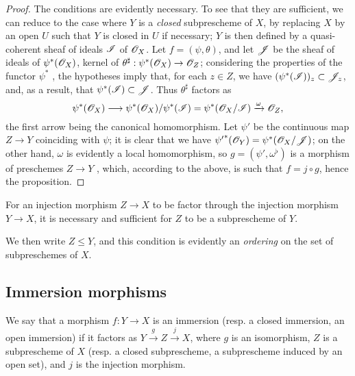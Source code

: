\begin{proof}
The conditions are evidently necessary.
To see that they are sufficient, we can reduce to the case where $Y$ is a \emph{closed} subprescheme of $X$, by replacing $X$ by an open $U$ such that $Y$ is closed in $U$  if necessary;
$Y$ is then defined by a quasi-coherent sheaf of ideals $\mathscr{I}$ of $\mathscr{O}_X$.
Let $f=(\psi,\theta)$, and let $\mathscr{J}$ be the sheaf of ideals of $\psi^*(\mathscr{O}_X)$, kernel of $\theta^\sharp:\psi^*(\sh{O}_X)\to\sh{O}_Z$;
considering the properties of the functor $\psi^*$ , the hypotheses imply that, for each $z\in Z$, we have $(\psi^*(\mathscr{I}))_z\subset\mathscr{J}_z$, and, as a result, that $\psi^*(\mathscr{I})\subset\mathscr{J}$.
Thus $\theta^\sharp$ factors as
\[
  \psi^*(\sh{O}_X)\to\psi^*(\sh{O}_X)/\psi^*(\sh{I})=\psi^*(\sh{O}_X/\sh{I})\xrightarrow{\omega}\sh{O}_Z,
\]
the first arrow being the canonical homomorphism.
Let $\psi'$ be the continuous map $Z\to Y$ coinciding with $\psi$;
it is clear that we have ${\psi'}^*(\mathscr{O}_Y)=\psi^*(\mathscr{O}_X/\mathscr{J})$;
on the other hand, $\omega$ is evidently a local homomorphism, so $g=(\psi',\omega^\flat)$ is a morphism
of preschemes $Z\to Y$ , which, according to the above, is such that $f=j\circ g$, hence the proposition.
\end{proof}

\begin{corollary}[4.1.10]
\label{I.4.1.10}
For an injection morphism $Z\to X$ to be factor through the injection morphism $Y\to X$, it is necessary and sufficient for $Z$ to be a subprescheme of $Y$.
\end{corollary}

We then write $Z\leq Y$, and this condition is evidently an \emph{ordering} on the set of subpreschemes of $X$.

\subsection{Immersion morphisms}
\label{subsection:I.4.2}

\begin{definition}[4.2.1]
\label{I.4.2.1}
We say that a morphism $f:Y\to X$ is an immersion (resp. a closed immersion, an open immersion) if it factors as $Y\xrightarrow{g}Z\xrightarrow{j}X$, where $g$ is an isomorphism, $Z$ is a subprescheme of $X$ (resp. a closed subprescheme, a subprescheme induced by an open set), and $j$ is the injection morphism.
\end{definition}

